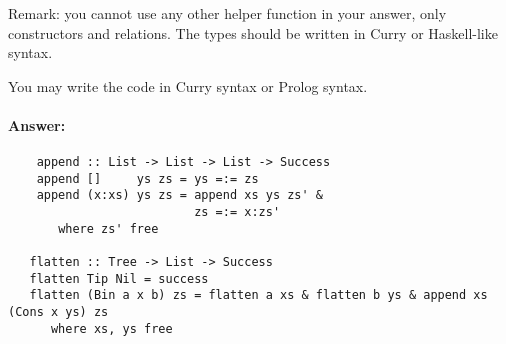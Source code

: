 \documentclass{article}
\newcommand{\answer}[0]{\paragraph{Answer:}}
\begin{document}
Remark: you cannot use any other helper function in your answer, only
constructors and relations. The types should be written in Curry or
Haskell-like syntax.

You may write the code in Curry syntax or Prolog syntax. 
\answer{
\begin{verbatim}
    append :: List -> List -> List -> Success
    append []     ys zs = ys =:= zs
    append (x:xs) ys zs = append xs ys zs' &
                          zs =:= x:zs'
       where zs' free

   flatten :: Tree -> List -> Success
   flatten Tip Nil = success
   flatten (Bin a x b) zs = flatten a xs & flatten b ys & append xs (Cons x ys) zs
      where xs, ys free
  \end{verbatim}
}
\end{document}
